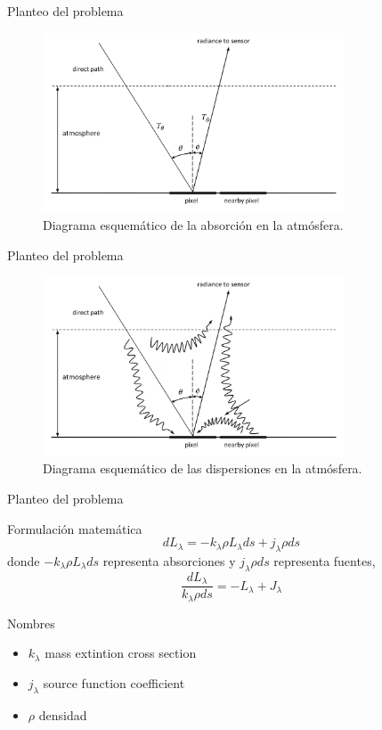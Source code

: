 \documentclass[handout]{beamer}
\begin{document}
\begin{frame}{Planteo del problema}
  \begin{figure}
  \centering
  \includegraphics[width=0.8\textwidth]{imagenes/tatmo.png}
  \caption{Diagrama esquemático de la absorción en la atmósfera.}
  \end{figure}
\end{frame}

\begin{frame}{Planteo del problema}
  \begin{figure}
  \centering
  \includegraphics[width=0.8\textwidth]{imagenes/patmo.png}
  \caption{Diagrama esquemático de las dispersiones en la atmósfera.}
  \end{figure}
\end{frame}

\begin{frame}{Planteo del problema}
  \begin{block}{Formulación matemática}
    $$d L_\lambda = -k_\lambda \rho L_\lambda ds + j_\lambda \rho ds$$
    donde $-k_\lambda \rho L_\lambda ds$ representa absorciones y $j_\lambda \rho ds$ representa fuentes, \pause
    $$ \frac{dL_\lambda}{k_\lambda \rho ds} = -L_\lambda + J_\lambda$$
  \end{block}
  \pause
  \begin{block}{Nombres}
    \begin{itemize}
      \item $k_\lambda$ mass extintion cross section
      \item $j_\lambda$ source function coefficient
      \item $\rho$ densidad
    \end{itemize}
  \end{block}
\end{frame}
\end{document}
